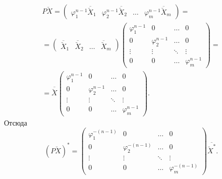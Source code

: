\begin{multline*}
    P \breve{X}
    = \begin{pmatrix}
        \varphi_1^{n-1} \overline{\breve{X}}_1 & \varphi_2^{n-1} \overline{\breve{X}}_2 & \dots & \varphi_m^{n-1} \overline{\breve{X}}_m
    \end{pmatrix} = \\
    = \begin{pmatrix}
        \overline{\breve{X}}_1 & \overline{\breve{X}}_2 & \dots & \overline{\breve{X}}_m
    \end{pmatrix}
    \begin{pmatrix}
        \varphi_1^{n-1} & 0               & \dots  & 0               \\
        0               & \varphi_2^{n-1} & \dots  & 0               \\
        \vdots          & \vdots          & \ddots & \vdots          \\
        0               & 0               & \dots  & \varphi_m^{n-1}
    \end{pmatrix} = \\
    = \overline{\breve{X}}
    \begin{pmatrix}
        \varphi_1^{n-1} & 0               & \dots  & 0               \\
        0               & \varphi_2^{n-1} & \dots  & 0               \\
        \vdots          & \vdots          & \ddots & \vdots          \\
        0               & 0               & \dots  & \varphi_m^{n-1}
    \end{pmatrix} .
\end{multline*}
Отсюда
\[
    \left( P \breve{X} \right)^*
    =
    \begin{pmatrix}
        \varphi_1^{-(n-1)} & 0                  & \dots  & 0                  \\
        0                  & \varphi_2^{-(n-1)} & \dots  & 0                  \\
        \vdots             & \vdots             & \ddots & \vdots             \\
        0                  & 0                  & \dots  & \varphi_m^{-(n-1)}
    \end{pmatrix}
    \overline{\breve{X}^*} .
\]

